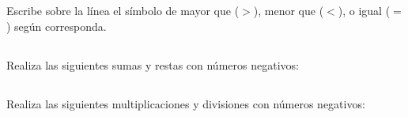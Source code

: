 \documentclass[12pt,addpoints,answers]{evalua}
\begin{document}
\begin{questions}
      \subsection*{\else{}\fi}
      \question[4] Escribe sobre la línea el símbolo de mayor que ($>$), menor que ($<$), o igual ($=$) según corresponda.

      \begin{multicols}{2}
      \end{multicols}

      \subsection*{\else{}\fi}
      \question[4] Realiza las siguientes sumas y restas con números negativos:

      \begin{multicols}{2}
      \end{multicols}

      \subsection*{\else{}\fi}
      \question[4] Realiza las siguientes multiplicaciones y divisiones con números negativos:
      \begin{multicols}{2}
            \begin{parts}

\end{parts}
\end{multicols}
\end{questions}
\end{document}
